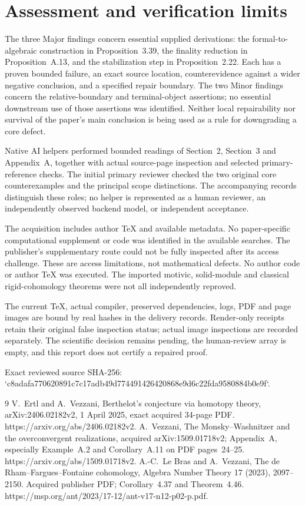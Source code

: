 \documentclass[10pt]{article}
\begin{document}
\section*{Assessment and verification limits}
The three Major findings concern essential supplied derivations: the formal-to-algebraic construction in Proposition 3.39, the finality reduction in Proposition A.13, and the stabilization step in Proposition 2.22. Each has a proven bounded failure, an exact source location, counterevidence against a wider negative conclusion, and a specified repair boundary. The two Minor findings concern the relative-boundary and terminal-object assertions; no essential downstream use of those assertions was identified. Neither local repairability nor survival of the paper’s main conclusion is being used as a rule for downgrading a core defect.\par
Native AI helpers performed bounded readings of Section 2, Section 3 and Appendix A, together with actual source-page inspection and selected primary-reference checks. The initial primary reviewer checked the two original core counterexamples and the principal scope distinctions. The accompanying records distinguish these roles; no helper is represented as a human reviewer, an independently observed backend model, or independent acceptance.\par
The acquisition includes author TeX and available metadata. No paper-specific computational supplement or code was identified in the available searches. The publisher’s supplementary route could not be fully inspected after its access challenge. These are access limitations, not mathematical defects. No author code or author TeX was executed. The imported motivic, solid-module and classical rigid-cohomology theorems were not all independently reproved.\par
The current TeX, actual compiler, preserved dependencies, logs, PDF and page images are bound by real hashes in the delivery records. Render-only receipts retain their original false inspection status; actual image inspections are recorded separately. The scientific decision remains pending, the human-review array is empty, and this report does not certify a repaired proof.\par
Exact reviewed source SHA-256: `c8adafa770620891c7c17adb49d774491426420868e9d6c22fda9580884b0e9f`.\par
9 V. Ertl and A. Vezzani, Berthelot’s conjecture via homotopy theory, arXiv:2406.02182v2, 1 April 2025, exact acquired 34-page PDF. https://arxiv.org/abs/2406.02182v2. A. Vezzani, The Monsky–Washnitzer and the overconvergent realizations, acquired arXiv:1509.01718v2; Appendix A, especially Example A.2 and Corollary A.11 on PDF pages 24–25. https://arxiv.org/abs/1509.01718v2. A.-C. Le Bras and A. Vezzani, The de Rham–Fargues–Fontaine cohomology, Algebra Number Theory 17 (2023), 2097–2150. Acquired publisher PDF; Corollary 4.37 and Theorem 4.46. https://msp.org/ant/2023/17-12/ant-v17-n12-p02-p.pdf.\par
\end{document}
